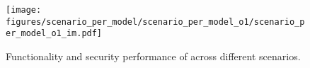 \vspace{1in} %
\begin{figure}[h]
    \centering
    \texttt{[image: figures/scenario\_per\_model/scenario\_per\_model\_o1/scenario\_per\_model\_o1\_im.pdf]}
    \caption{Functionality and security performance of \openaione{} across different scenarios.}
    \label{fig:scenario_per_model_o1}
\end{figure}
